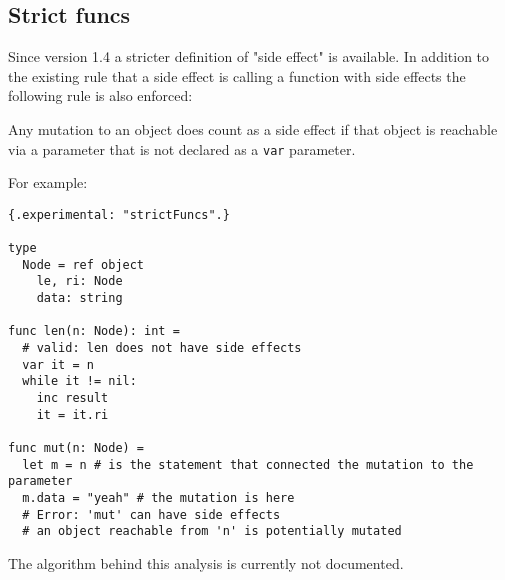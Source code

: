 \hypertarget{strict-funcs}{%
\subsection{Strict funcs}\label{strict-funcs}}

Since version 1.4 a stricter definition of "side effect" is available.
In addition to the existing rule that a side effect is calling a
function with side effects the following rule is also enforced:

Any mutation to an object does count as a side effect if that object is
reachable via a parameter that is not declared as a \texttt{var}
parameter.

For example:

\begin{verbatim}
{.experimental: "strictFuncs".}

type
  Node = ref object
    le, ri: Node
    data: string

func len(n: Node): int =
  # valid: len does not have side effects
  var it = n
  while it != nil:
    inc result
    it = it.ri

func mut(n: Node) =
  let m = n # is the statement that connected the mutation to the parameter
  m.data = "yeah" # the mutation is here
  # Error: 'mut' can have side effects
  # an object reachable from 'n' is potentially mutated
\end{verbatim}

The algorithm behind this analysis is currently not documented.
